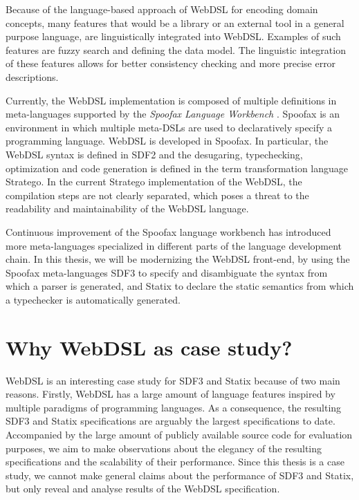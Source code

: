   Because of the language-based approach of WebDSL for encoding domain concepts, many features that would be a library or an external tool in a general purpose language, are linguistically integrated into WebDSL. Examples of such features are fuzzy search and defining the data model. The linguistic integration of these features allows for better consistency checking and more precise error descriptions.
  
  Currently, the WebDSL implementation is composed of multiple definitions in meta-languages supported by the \textit{Spoofax Language Workbench} \autocite{KatsV10}. Spoofax is an environment in which multiple meta-DSLs are used to declaratively specify a programming language. WebDSL is developed in Spoofax. In particular, the WebDSL syntax is defined in SDF2 and the desugaring, typechecking, optimization and code generation is defined in the term transformation language Stratego. In the current Stratego implementation of the WebDSL, the compilation steps are not clearly separated, which poses a threat to the readability and maintainability of the WebDSL language.

  Continuous improvement of the Spoofax language workbench has introduced more meta-languages specialized in different parts of the language development chain. In this thesis, we will be modernizing the WebDSL front-end, by using the Spoofax meta-languages SDF3 to specify and disambiguate the syntax from which a parser is generated, and Statix to declare the static semantics from which a typechecker is automatically generated.

  \section{\label{sec:why-webdsl}Why WebDSL as case study?}

    WebDSL is an interesting case study for SDF3 and Statix because of two main reasons. Firstly, WebDSL has a large amount of language features inspired by multiple paradigms of programming languages. As a consequence, the resulting SDF3 and Statix specifications are arguably the largest specifications to date. Accompanied by the large amount of publicly available source code for evaluation purposes, we aim to make observations about the elegancy of the resulting specifications and the scalability of their performance. Since this thesis is a case study, we cannot make general claims about the performance of SDF3 and Statix, but only reveal and analyse results of the WebDSL specification.


